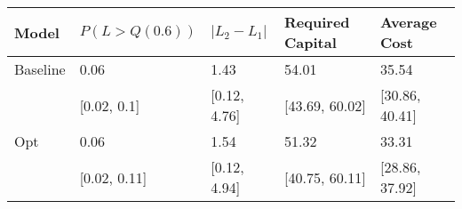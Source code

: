 \begin{tabular}{lllll}
\toprule
   Model & $P(L > Q(0.6))$ & $|L_2 - L_1|$ & Required Capital &   Average Cost \\
\midrule
Baseline &            0.06 &          1.43 &            54.01 &          35.54 \\
         &     [0.02, 0.1] &  [0.12, 4.76] &   [43.69, 60.02] & [30.86, 40.41] \\
     Opt &            0.06 &          1.54 &            51.32 &          33.31 \\
         &    [0.02, 0.11] &  [0.12, 4.94] &   [40.75, 60.11] & [28.86, 37.92] \\
\bottomrule
\end{tabular}
